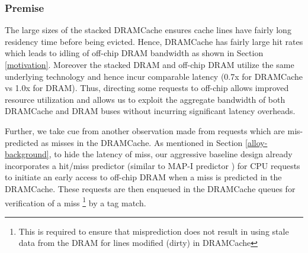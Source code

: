 \subsubsection{Premise}
The large sizes of the stacked DRAMCache ensures cache lines have fairly long residency time before being evicted. Hence, DRAMCache has fairly large hit rates which leads to idling of off-chip DRAM bandwidth as shown in Section \ref{motivation}. Moreover the stacked DRAM and off-chip DRAM utilize the same underlying technology and hence incur comparable latency (0.7x for DRAMCache vs 1.0x for DRAM). Thus, directing some requests to off-chip allows improved resource utilization and allows us to exploit the aggregate bandwidth of both DRAMCache and DRAM buses without incurring significant latency overheads.
\par Further, we take cue from another observation made from requests which are mis-predicted as misses in the DRAMCache. As mentioned in Section \ref{alloy-background}, to hide the latency of miss, our aggressive baseline design already incorporates a hit/miss predictor (similar to MAP-I predictor \cite{alloy}) for CPU requests to initiate an early access to off-chip DRAM when a miss is predicted in the DRAMCache. These requests are then enqueued in the DRAMCache queues for verification of a miss 
\footnote{This is required to ensure that misprediction does not result in using stale data from the DRAM for lines modified (dirty) in DRAMCache}
by a tag match. 

